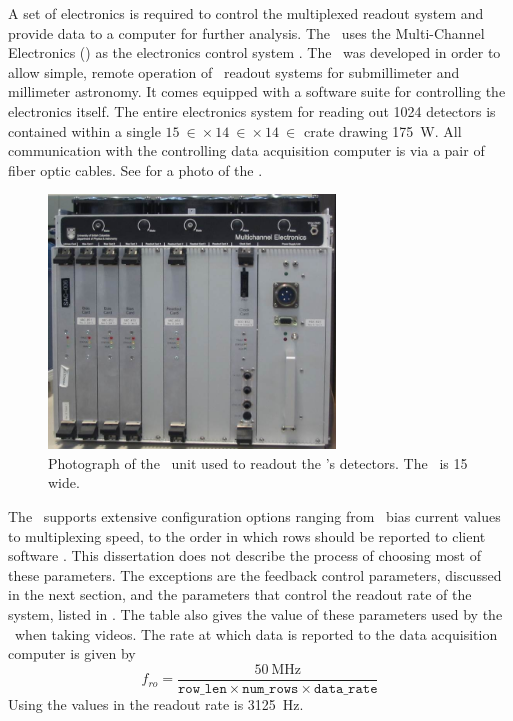 A set of electronics is required to control the multiplexed readout system and provide data to a computer for further analysis.
The \Imager\ uses the Multi-Channel Electronics (\MCE) as the electronics control system \cite{battistelli_functional_2008,battistelli_automated_2008,_mcewiki_2014}.
The \MCE\ was developed in order to allow simple, remote operation of \TDM\ readout systems for submillimeter and millimeter astronomy.
It comes equipped with a software suite for controlling the electronics itself.
The entire electronics system for reading out 1024 detectors is contained within a single $\SI{15}{\in} \times \SI{14}{\in} \times \SI{14}{\in}$ crate drawing \SI{175}{\W}.
All communication with the controlling data acquisition computer is via a pair of fiber optic cables.
See  for a photo of the \MCE.

\begin{figure}
\centering
\includegraphics[width=3in]{images/ch4-mce.jpg}
\caption[Photograph of the \MCE]{
  Photograph of the \MCE\ unit used to readout the \Imager's detectors.
  The \MCE\ is \SI{15}{\in} wide.
}
\label{fig:ch4-mce-photo}
\end{figure}


The \MCE\ supports extensive configuration options ranging from \SQUID\ bias current values to multiplexing speed, to the order in which rows should be reported to client software \cite{_mcewiki_2014}.
This dissertation does not describe the process of choosing most of these parameters.
The exceptions are the feedback control parameters, discussed in the next section, and the parameters that control the readout rate of the system, listed in .
The table also gives the value of these parameters used by the \Imager\ when taking videos.
The rate at which data is reported to the data acquisition computer is given by
\begin{equation} \label{eqn:ch4-mce-readout-rate}
  f_{ro} = \frac{ \SI{50}{\MHz} }{\texttt{row\_len} \times \texttt{num\_rows} \times \texttt{data\_rate} }
\end{equation}
Using the values in  the readout rate is \SI{3125}{\Hz}.

